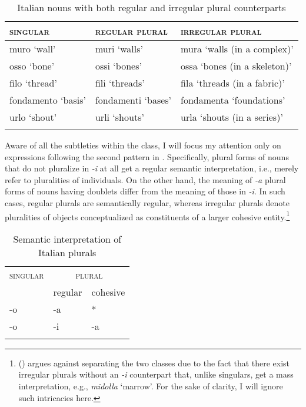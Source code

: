 \begin{table}[h]
\centering
\begin{tabular}{lll}
\lsptoprule
\textsc{singular} & \textsc{regular plural} & \textsc{irregular plural}             \\ \midrule
muro `wall'        & muri `walls'      & mura `walls (in a complex)'    \\
osso `bone'        & ossi `bones'       & ossa `bones (in a skeleton)' \\
filo `thread'       & fili `threads'      & fila `threads (in a fabric)'                \\
fondamento `basis' & fondamenti `bases' & fondamenta `foundations'     \\
urlo `shout'       & urli `shouts'      & urla `shouts (in a series)'      \\ \lspbottomrule
\end{tabular}
\caption{Italian nouns with both regular and irregular plural counterparts} 
\label{tab:italian-nouns-regular-irregular-plurals}
\end{table}

Aware of all the subtleties within the class, I will focus my attention only on expressions following the second pattern in   \citep{acquaviva2008lexical}. Specifically, plural forms of nouns that do not pluralize in \textit{-i} at all get a regular semantic interpretation, i.e., merely refer to pluralities of individuals. On the other hand, the meaning of \textit{-a} plural forms of nouns having doublets differ from the meaning of those in \textit{-i}. In such cases, regular plurals are semantically regular, whereas irregular plurals denote pluralities of objects conceptualized as constituents of a larger cohesive entity.\footnote{\citeauthor{acquaviva2008lexical} (\citeyear[pp. 151--152]{acquaviva2008lexical}) argues against separating the two classes due to the fact that there exist irregular plurals without an \textit{-i} counterpart that, unlike singulars, get a mass interpretation, e.g., \textit{midolla} `marrow'. For the sake of clarity, I will ignore such intricacies here.}

\begin{table}[h]
\centering
\begin{tabular}{lll}
\lsptoprule
\textsc{singular} & \multicolumn{2}{c}{\textsc{plural}} \\
         & regular & cohesive \\
\midrule
-o       & -a      & *  \\
-o       & -i      & -a \\                    
\lspbottomrule
\end{tabular}
\caption{Semantic interpretation of Italian plurals}
\label{tab:semantic-interpretation-italian-plurals}
\end{table}

